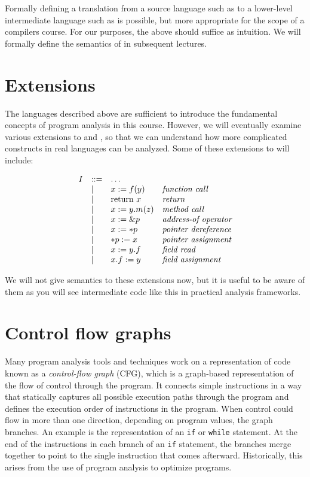 \documentclass[11pt]{article}
\begin{document}
Formally defining a translation from a source language such as
\WhileLang to a lower-level intermediate language such as \WhileThAddr is possible,
but more appropriate for the scope of a compilers course.  For our purposes, the
above should suffice as intuition.  We will formally define the semantics of
\WhileThAddr in subsequent lectures.

\section{Extensions}

The languages described above are sufficient to introduce the fundamental concepts of program
analysis in this course. However, we will eventually examine various extensions to \WhileLang and
\WhileThAddr, so that we can understand how more complicated constructs in real languages can
be analyzed. Some of these extensions to \WhileThAddr will include:

\[
\begin{array}{llll}
I & ::= & \ldots \\
  & \mathrel{\mid} & x := f(y) & \textit{function call} \\
  & \mathrel{\mid} & \mbox{return}~x & \textit{return} \\
  & \mathrel{\mid} & x := y.m(z) & \textit{method call} \\
  & \mathrel{\mid} & x := \&p & \textit{address-of operator} \\
  & \mathrel{\mid} & x := *p & \textit{pointer dereference} \\
  & \mathrel{\mid} & *p := x & \textit{pointer assignment} \\
  & \mathrel{\mid} & x := y.f & \textit{field read} \\
  & \mathrel{\mid} & x.f := y & \textit{field assignment} \\
  
\end{array}
\]

We will not give semantics to these extensions now, but it is useful to be aware of them as you
will see intermediate code like this in practical analysis frameworks.



\section{Control flow graphs}

Many program analysis tools and techniques work on a representation of code known as a
\textit{control-flow graph} (CFG), which is a graph-based representation of the
flow of control through the program.  It connects simple instructions in a way
that statically captures all possible execution paths through the program and
defines the execution order of instructions in the program.  When control could
flow in more than one direction, depending on program values, the graph
branches.  An example is the representation of an \texttt{if} or \texttt{while}
statement.  At the end of the instructions in each branch of an \texttt{if}
statement, the branches merge together to point to the single instruction that
comes afterward.  Historically, this arises from the use of program analysis to
optimize programs.
\end{document}
